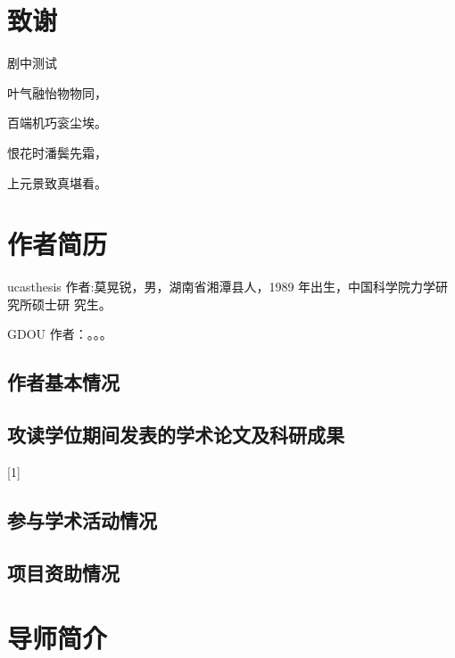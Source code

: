 \chapter{致\quad 谢}
\begin{center}
剧中测试

叶气融怡物物同，

百端机巧衮尘埃。

恨花时潘鬓先霜，

上元景致真堪看。
\end{center}
\chapter{作者简历}
ucasthesis 作者:莫晃锐，男，湖南省湘潭县人，1989 年出生，中国科学院力学研究所硕士研
究生。

GDOU 作者：。。。

\section*{作者基本情况}






\section*{攻读学位期间发表的学术论文及科研成果}

[1]

\section*{参与学术活动情况}


\section*{项目资助情况}


\chapter{导师简介}
